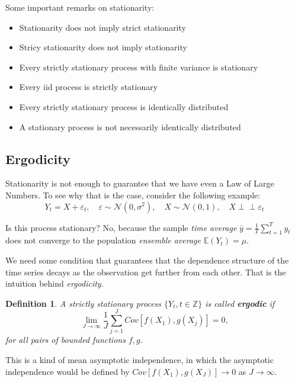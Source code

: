 \documentclass[11pt, a4paper]{report}
\newcommand{\indep}{\perp \!\!\! \perp}
\theoremstyle{plain}
\theoremstyle{plain}
\newtheorem{defn}{Definition}[section]
\theoremstyle{remark}
\begin{document}
\vspace{1em}

Some important remarks on stationarity: 
\begin{itemize}
	\item Stationarity does not imply strict stationarity
	\item Stricy stationarity does not imply stationarity
	\item Every strictly stationary process with finite variance is stationary
	\item Every iid process is strictly stationary
	\item Every strictly stationary process is identically distributed
	\item A stationary process is not necessarily identically distributed
\end{itemize}

\subsection{Ergodicity}

Stationarity is not enough to guarantee that we have even a Law of Large Numbers. To see why that is the case, consider the following example:
$$ Y_t = X + \varepsilon_t, \hspace{1em} \varepsilon \sim \mathcal{N}(0, \sigma^2), \hspace{1em} X \sim \mathcal{N}(0,1), \hspace{1em} X \indep \varepsilon_t $$

Is this process stationary? No, because the sample \textit{time average} $\bar{y} = \frac{1}{T}\sum_{t=1}^T y_t$ does not converge to the population \textit{ensemble average} $\mathbb{E}(Y_t) = \mu$.

We need some condition that guarantees that the dependence structure of the time series decays as the observation get further from each other. That is the intuition behind \textit{ergodicity.}

\begin{defn}
	A strictly stationary process $\{Y_t, t \in \mathbb{Z} \}$ is called \textbf{ergodic} if
	$$ \lim_{J \rightarrow \infty} \dfrac{1}{J} \sum_{j=1}^J Cov[f(X_1), g(X_j)] = 0, $$
	for all pairs of bounded functions $f, g$.
\end{defn}

This is a kind of mean asymptotic independence, in which the asymptotic independence would be defined by $Cov[f(X_1), g(X_J)] \rightarrow 0$ as $J \rightarrow \infty$. 
\end{document}
